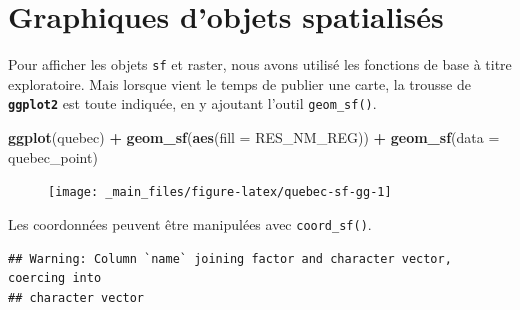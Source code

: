 \documentclass[]{book}
\newenvironment{Shaded}{\begin{snugshade}}{\end{snugshade}}
\newcommand{\DataTypeTok}[1]{\textcolor[rgb]{0.13,0.29,0.53}{#1}}
\newcommand{\KeywordTok}[1]{\textcolor[rgb]{0.13,0.29,0.53}{\textbf{#1}}}
\newcommand{\NormalTok}[1]{#1}
\newcommand{\OperatorTok}[1]{\textcolor[rgb]{0.81,0.36,0.00}{\textbf{#1}}}
\newcommand{\StringTok}[1]{\textcolor[rgb]{0.31,0.60,0.02}{#1}}
\begin{document}
\hypertarget{graphiques-dobjets-spatialisuxe9s}{%
\section{Graphiques d'objets
spatialisés}\label{graphiques-dobjets-spatialisuxe9s}}

Pour afficher les objets \texttt{sf} et raster, nous avons utilisé les
fonctions de base à titre exploratoire. Mais lorsque vient le temps de
publier une carte, la trousse de \textbf{\texttt{ggplot2}} est toute
indiquée, en y ajoutant l'outil \texttt{geom\_sf()}.

\begin{Shaded}
\begin{Highlighting}[]
\KeywordTok{ggplot}\NormalTok{(quebec) }\OperatorTok{+}
\StringTok{  }\KeywordTok{geom_sf}\NormalTok{(}\KeywordTok{aes}\NormalTok{(}\DataTypeTok{fill =}\NormalTok{ RES_NM_REG)) }\OperatorTok{+}
\StringTok{  }\KeywordTok{geom_sf}\NormalTok{(}\DataTypeTok{data =}\NormalTok{ quebec_point)}
\end{Highlighting}
\end{Shaded}

\begin{figure}

{\centering \texttt{[image: \_main\_files/figure-latex/quebec-sf-gg-1]} 

}

\caption{ }\label{fig:quebec-sf-gg}
\end{figure}

Les coordonnées peuvent être manipulées avec \texttt{coord\_sf()}.

\begin{Shaded}
\end{Shaded}

\begin{verbatim}
## Warning: Column `name` joining factor and character vector, coercing into
## character vector
\end{verbatim}
\end{document}
